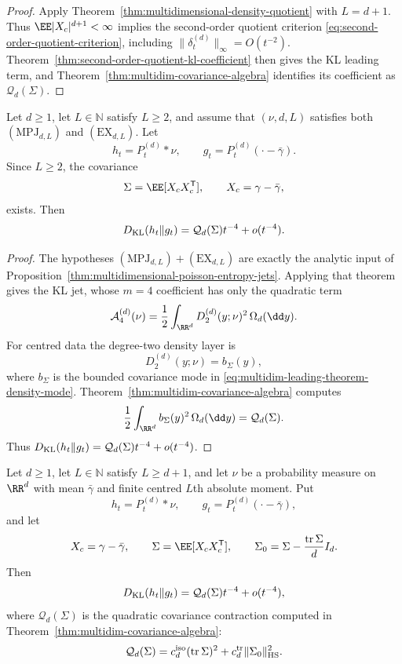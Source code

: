 \begin{proof}
Apply Theorem~\ref{thm:multidimensional-density-quotient} with
\(L=d+1\).  Thus \(\EE|X_c|^{d+1}<\infty\) implies the second-order quotient criterion
\eqref{eq:second-order-quotient-criterion}, including
\(\|\delta_t^{(d)}\|_\infty=O(t^{-2})\).  Theorem~\ref{thm:second-order-quotient-kl-coefficient}
then gives the KL leading term, and
Theorem~\ref{thm:multidim-covariance-algebra} identifies its
coefficient as \(\mathcal Q_d(\Sigma)\).
\end{proof}

\begin{corollary}%
\label{cor:multidim-leading-kl-coefficient}
Let \(d\ge1\), let \(L\in\mathbb N\) satisfy \(L\ge2\), and assume that
\((\nu,d,L)\) satisfies both \((\mathrm{MPJ}_{d,L})\) and
\((\mathrm{EX}_{d,L})\).  Let
\[
h_t=P_t^{(d)}*\nu,\qquad
g_t=P_t^{(d)}(\cdot-\bar{\gamma}).
\]
Since \(L\ge2\), the covariance
\[
\Sigma=\EE[X_cX_c^{\mathsf T}],\qquad X_c=\gamma-\bar{\gamma},
\]
exists.  Then
\[
D_{\rm KL}(h_t\|g_t)
=\mathcal Q_d(\Sigma)t^{-4}+o(t^{-4}).
\]
\end{corollary}

\begin{proof}
The hypotheses \((\mathrm{MPJ}_{d,L})+(\mathrm{EX}_{d,L})\) are exactly the
analytic input of Proposition~\ref{thm:multidimensional-poisson-entropy-jets}.
Applying that theorem gives the KL jet, whose \(m=4\) coefficient has only the quadratic
term
\[
\mathcal A_4^{(d)}(\nu)
=\frac12\int_{\RR^d}D_2^{(d)}(y;\nu)^2\,\Omega_d(\dd y).
\]
For centred data the degree-two density layer is
\[
D_2^{(d)}(y;\nu)=b_\Sigma(y),
\]
where \(b_\Sigma\) is the bounded covariance mode in
\eqref{eq:multidim-leading-theorem-density-mode}.  Theorem~\ref{thm:multidim-covariance-algebra}
computes
\[
\frac12\int_{\RR^d}b_\Sigma(y)^2\,\Omega_d(\dd y)=\mathcal Q_d(\Sigma).
\]
Thus \(D_{\rm KL}(h_t\|g_t)=\mathcal Q_d(\Sigma)t^{-4}+o(t^{-4})\).
\end{proof}

\begin{corollary}%
\label{cor:multidim-finite-moment-covariance-coefficient}
Let \(d\ge1\), let \(L\in\mathbb N\) satisfy \(L\ge d+1\), and let \(\nu\) be
a probability measure on \(\RR^d\) with mean \(\bar{\gamma}\) and finite
centred \(L\)th absolute moment.  Put
\[
h_t=P_t^{(d)}*\nu,\qquad
g_t=P_t^{(d)}(\cdot-\bar{\gamma}),
\]
and let
\[
X_c=\gamma-\bar{\gamma},\qquad
\Sigma=\EE[X_cX_c^{\mathsf T}],\qquad
\Sigma_0=\Sigma-\frac{\operatorname{tr}\Sigma}{d}I_d .
\]
Then
\begin{equation}\label{eq:finite-moment-covariance-coefficient-through-mpj}
D_{\rm KL}(h_t\|g_t)=\mathcal Q_d(\Sigma)t^{-4}+o(t^{-4}),
\end{equation}
where \(\mathcal Q_d(\Sigma)\) is the quadratic covariance contraction computed
in Theorem~\ref{thm:multidim-covariance-algebra}:
\[
\mathcal Q_d(\Sigma)
=c_d^{\rm iso}(\operatorname{tr}\Sigma)^2
+c_d^{\rm tr}\|\Sigma_0\|_{\rm HS}^2 .
\]
\end{corollary}


